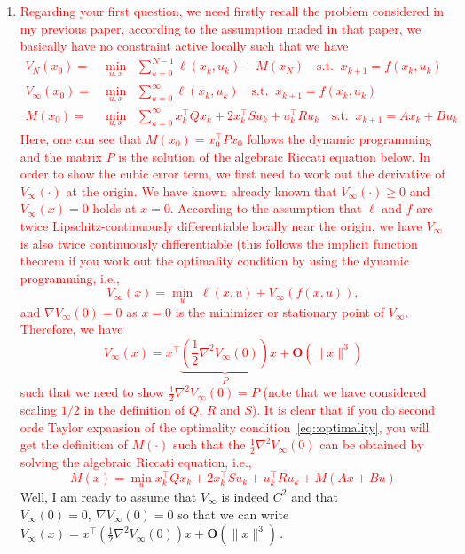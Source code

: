 \documentclass[12pt]{article}
\numberwithin{theorem}{section} %
\theoremstyle{definition}
\theoremstyle{remark}
\begin{document}
\begin{enumerate}
	\item[] \textcolor{red}{Regarding your first question, we need firstly recall the problem considered in my previous paper, according to the assumption maded in that paper, we basically have no constraint active locally such that we have 
	\[
	\begin{aligned}
	V_N(x_0) =& \min_{u,x}\;\;\sum_{k=0}^{N-1}\ell(x_k,u_k) + M(x_N) \quad \text{s.t.}\;\;x_{k+1} = f(x_k,u_k)\\
	V_\infty(x_0) =& \min_{u,x}\;\;\sum_{k=0}^{\infty}\ell(x_k,u_k) \quad \text{s.t.}\;\;x_{k+1} = f(x_k,u_k)\\
	M(x_0) =& \min_{u,x}\;\;\sum_{k=0}^{\infty}x_k^\top Q x_k + 2 x_k^\top S u_k + u_k^\top R u_k \quad \text{s.t.}\;\;x_{k+1} = A x_k + B u_k
	\end{aligned}
	\]
	Here, one can see that $M(x_0) = x_0^\top P x_0$ follows the dynamic programming and the matrix $P$ is the solution of the algebraic Riccati equation below. In order to show the cubic error term, we first need to work out the derivative of $V_\infty(\cdot)$ at the origin. We have known already known that $V_\infty(\cdot)\geq  0$ and $V_\infty(x)=0$ holds at $x=0$. According to the assumption that $\ell $ and $f$ are twice Lipschitz-continuously differentiable locally near the origin, we have $V_\infty$ is also twice continuously differentiable (this follows the implicit function theorem if you work out the optimality condition by using the dynamic programming, i.e., 
	\begin{equation}\label{eq::optimality}
	V_\infty(x) = \min_u\;\ell(x,u)+V_\infty(f(x,u)),
	\end{equation} 
	and
	$
	\nabla V_\infty(0) =0 
	$
	as $x=0$ is the minimizer or stationary point of $V_\infty$. Therefore, we have 
	\[
     V_\infty(x) = x^\top \underbrace{\left(\frac{1}{2} \nabla^2 V_\infty(0)\right)}_{P} x + \mathbf{O}(\|x\|^3) 
	\]
    such that we need to show $\frac{1}{2}\nabla^2 V_\infty(0)=P$ (note that we have considered scaling $1/2$ in the definition of $Q$, $R$ and $S$). It is clear that if you do second orde Taylor expansion of the optimality condition~\eqref{eq::optimality}, you will get the definition of $M(\cdot)$ such that the $\frac{1}{2}\nabla^2 V_\infty(0)$ can be obtained by solving the algebraic Riccati equation, i.e., 
    \[
    M(x) = \min_u x_k^\top Q x_k + 2 x_k^\top S u_k + u_k^\top R u_k + M(Ax+Bu)
    \]
	}
	Well, I am ready to assume that $V_\infty$ is indeed $C^2$ and that $V_\infty(0)=0,~\nabla V_\infty(0)=0$ so that we can write $V_\infty(x) = x^\top \left(\frac{1}{2} \nabla^2 V_\infty(0)\right) x + \mathbf{O}(\|x\|^3) $\,.

\end{enumerate}
\end{document}
